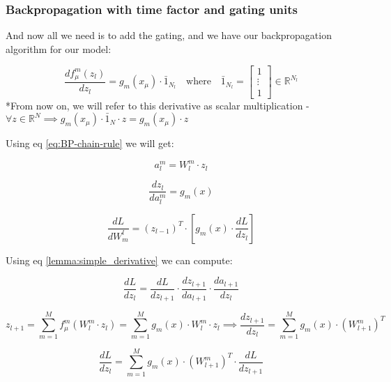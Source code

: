 \subsubsection{Backpropagation with time factor and gating units}

And now all we need is to add the gating, and we have our backpropagation algorithm for our model:

\begin{equation}
\frac{df_\mu^m(z_l)}{dz_l} = g_m(x_\mu) \cdot \bar{1}_{N_l} \quad \text{where} \quad \bar{1}_{N_l} = \begin{bmatrix} 1 \\ \vdots \\ 1 \end{bmatrix} \in \mathbb{R}^{N_l}
\end{equation}
*From now on, we will refer to this derivative as scalar multiplication - \\
$\forall z \in \mathbb{R}^N \implies g_m(x_\mu) \cdot \bar{1}_N \cdot z = g_m(x_\mu) \cdot z$


Using eq \ref{eq:BP-chain-rule} we will get:

\begin{equation}
    a_l^m = W_l^m \cdot z_l
\end{equation}

\begin{equation}
    \frac{dz_l}{da_l^m} = g_m(x)
\end{equation}

\begin{equation}
    \frac{dL}{dW_m^l} = (z_{l-1})^T \cdot [g_m(x) \cdot \frac{dL}{dz_l}]
\end{equation}

Using eq \ref{lemma:simple_derivative} we can compute:

\begin{equation}
    \frac{dL}{dz_l} = \frac{dL}{dz_{l+1}} \cdot \frac{dz_{l+1}}{da_{l+1}} \cdot \frac{da_{l+1}}{dz_l}
\end{equation}

\begin{equation}
    z_{l+1} = \sum_{m=1}^M f_\mu^m (W_l^m \cdot z_l) = \sum_{m=1}^M g_m(x) \cdot W_l^m \cdot z_l \implies \frac{dz_{l+1}}{dz_l} = \sum_{m=1}^M g_m(x) \cdot (W_{l+1}^m)^T
\end{equation}

\begin{equation}
    \frac{dL}{dz_l} = \sum_{m=1}^M g_m(x) \cdot (W_{l+1}^m)^T \cdot \frac{dL}{dz_{l+1}}
\end{equation}

